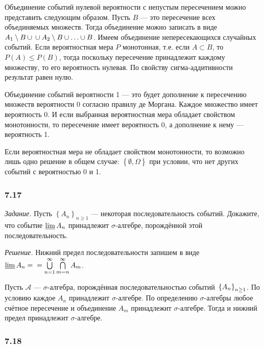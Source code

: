 Объединение событий нулевой вероятности с непустым пересечением можно представить следующим образом.
Пусть $B$ --- это пересечение всех объединяемых множеств.
Тогда объединение можно записать в виде $A_1 \setminus B \cup \\
\cup A_2 \setminus B \cup \dotsc \cup B$.
Имеем объединение непересекающихся случайных событий.
Если вероятностная мера $P$ монотонная,
т.е. если $A \subset B$, то $P \left( A \right) \leq P \left( B \right) $, тогда поскольку пересечение принадлежит каждому множеству, то его вероятность нулевая.
По свойству сигма-аддитивности результат равен нулю.

Объединение событий вероятности 1 --- это будет дополнение к пересечению множеств вероятности 0 согласно правилу де Моргана.
Каждое множество имеет вероятность 0.
И если выбранная вероятностная мера обладает свойством монотонности, то пересечение имеет вероятность 0, а дополнение к нему --- вероятность 1.

Если вероятностная мера не обладает свойством монотонности, то возможно лишь одно решение в общем случае:
$ \left\{ \emptyset, \Omega \right\} $ при условии, что нет других событий с вероятностью 0 и 1.

\subsubsection*{7.17}

\textit{Задание.} Пусть $ \left\{ A_n \right\}_{n \geq 1}$ --- некоторая последовательность событий.
Докажите, что событие $ \varliminf A_n$ принадлежит $ \sigma $-алгебре, порождённой этой последовательность.

\textit{Решение.} Нижний предел последовательности запишем в виде $ \varliminf A_n = \\
= \bigcup \limits_{n=1}^{ \infty } \bigcap \limits_{m=n}^{ \infty } A_m$.

Пусть $ \mathcal{A}$ --- $ \sigma $-алгебра, порождённая последовательностью событий $ \\
\left\{ A_n \right\}_{n \geq 1}$.
По условию каждое $A_n$ принадлежит $ \sigma $-алгебре.
По определению $ \sigma $-алгебры любое счётное пересечение и объединение $A_m$ принадлежит $ \sigma $-алгебре.
Тогда и нижний предел принадлежит $ \sigma $-алгебре.

\subsubsection*{7.18}

